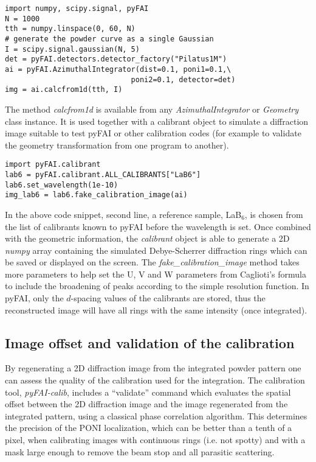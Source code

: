\documentclass{iucr}
\begin{document}
\begin{verbatim}
import numpy, scipy.signal, pyFAI
N = 1000 
tth = numpy.linspace(0, 60, N)
# generate the powder curve as a single Gaussian
I = scipy.signal.gaussian(N, 5)
det = pyFAI.detectors.detector_factory("Pilatus1M")
ai = pyFAI.AzimuthalIntegrator(dist=0.1, poni1=0.1,\
                             poni2=0.1, detector=det)
img = ai.calcfrom1d(tth, I)
\end{verbatim}


The method \textit{calcfrom1d} is available from any
\textit{AzimuthalIntegrator} or \textit{Geometry} class instance.
It is used together with a calibrant object to simulate a diffraction
image suitable to test pyFAI or other calibration codes (for example to
validate the geometry transformation from one program to another).



\begin{verbatim}
import pyFAI.calibrant
lab6 = pyFAI.calibrant.ALL_CALIBRANTS["LaB6"]
lab6.set_wavelength(1e-10)
img_lab6 = lab6.fake_calibration_image(ai)
\end{verbatim}

In the above code snippet, second line, a reference sample,
LaB$_6$, is chosen from the list of calibrants known to pyFAI before the
wavelength is set.
Once combined with the geometric information, the \textit{calibrant} object is
able to generate a 2D \textit{numpy} array containing the simulated Debye-Scherrer
diffraction rings which can be saved or displayed on the screen.
The \textit{fake\_calibration\_image} method takes more parameters to help set
the U, V and W parameters from Caglioti's formula \cite{caglioti} to include the
broadening of peaks according to the simple resolution function.
In pyFAI, only the $d$-spacing values of the calibrants are stored, thus
the reconstructed image will have all rings with the same intensity (once integrated).

\subsection{Image offset and validation of the calibration}
By regenerating a 2D diffraction image from the integrated powder pattern one
can assess the quality of the calibration used for the integration.
The calibration tool, \textit{pyFAI-calib}, includes  a ``validate'' command
which evaluates the spatial offset between the 2D diffraction image and the
image regenerated from the integrated pattern, using a classical phase
correlation algorithm.
This determines the precision of the PONI localization, which
can be better than a tenth of a pixel, when calibrating images with continuous
rings (i.e. not spotty) and with a mask large enough to remove the beam stop and
all parasitic scattering.
\end{document}
